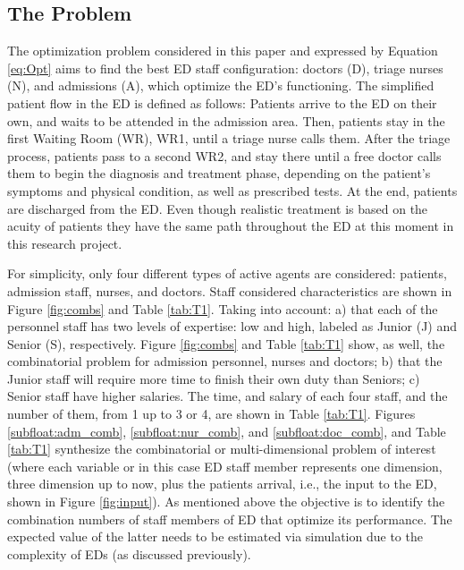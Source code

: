 \documentclass[11pt]{article} %
\begin{document}
\subsection{The Problem}
\label{ssec:desc}

The optimization problem  considered in this paper and expressed by Equation \eqref{eq:Opt} aims to find the best ED staff configuration: doctors (D), triage nurses (N), and admissions (A), which optimize the ED's functioning. The simplified  patient flow in the ED is defined as follows:  Patients arrive to the ED on their own, and waits to be attended in the admission area. Then, patients stay in the first Waiting Room (WR), WR1, until a triage nurse calls them. After the triage process, patients pass to a second WR2, and stay there until a free doctor calls them to begin the diagnosis and treatment phase, depending on the patient's symptoms and physical condition, as well as prescribed tests. At the end, patients are discharged from the ED. Even though realistic treatment is based on the acuity of patients they have the same path throughout the ED at this moment in this research project.


For simplicity, only four different types of active agents are considered: patients, admission staff, nurses, and doctors. Staff  considered characteristics are shown in Figure \ref{fig:combs} and Table \ref{tab:T1}. Taking into account: a) that each of the personnel staff has two levels of expertise:  low and high, labeled as Junior (J) and Senior (S), respectively. Figure \ref{fig:combs} and Table \ref{tab:T1}  show, as well, the combinatorial problem for admission personnel, nurses and doctors; b) that the Junior staff will require more time to finish their own duty than Seniors; c) Senior staff have higher salaries. The time, and salary of each four staff, and the number of them, from 1 up to 3 or 4, are shown in Table \ref{tab:T1}.  Figures \ref{subfloat:adm_comb}, \ref{subfloat:nur_comb}, and \ref{subfloat:doc_comb}, and Table \ref{tab:T1}  synthesize the combinatorial or multi-dimensional problem of interest (where each variable or in this case ED staff member represents one dimension, three dimension up to now, plus the patients arrival, i.e., the input to the ED, shown in Figure \ref{fig:input}).  As mentioned above the objective is to identify the combination numbers of staff members of ED that optimize its performance. The expected value of the latter needs to be estimated via simulation due to the complexity of EDs (as discussed previously).
\end{document}
